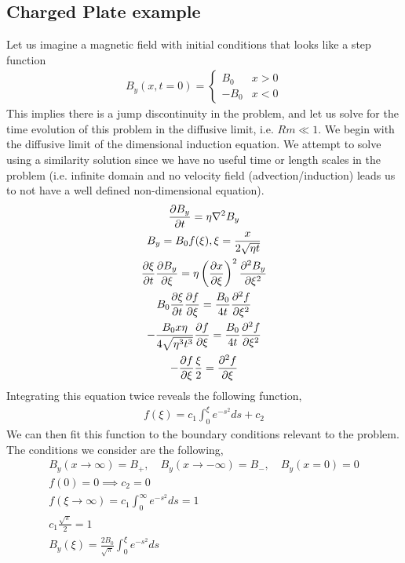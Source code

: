 \documentclass{article}
\begin{document}
\section{}

\subsection{Charged Plate example}

Let us imagine a magnetic field with initial conditions that looks like a step
function 
\begin{gather*}
    B_y(x, t=0) = \begin{cases} B_0 & x >0\\
                                -B_0 & x < 0\end{cases}
\end{gather*}
    This implies there is a jump discontinuity in the problem, and let us solve
    for the time evolution of this problem in the diffusive limit, i.e. $Rm \ll
    1$. We begin with the diffusive limit of the dimensional induction equation.
    We attempt to solve using a similarity solution since we have no useful time
    or length scales in the problem (i.e. infinite domain and no velocity field
    (advection/induction) leads us to not have a well defined non-dimensional
    equation). 
\begin{gather*}
    \frac{\partial B_y}{\partial t} = \eta\nabla^2B_y\\
    B_y = B_0f(\xi), \xi = \frac{x}{2\sqrt{\eta t}}\\
    \frac{\partial \xi}{\partial t}\frac{\partial B_y}{\partial \xi} = \eta\left(\frac{\partial x}{\partial \xi}\right)^2\frac{\partial ^2B_y}{\partial \xi^2}\\
    B_0\frac{\partial \xi}{\partial t}\frac{\partial f}{\partial \xi} = \frac{B_0}{4t}\frac{\partial ^2f}{\partial \xi^2}\\
    -\frac{B_0x\eta}{4\sqrt{\eta^3t^3}}\frac{\partial f}{\partial \xi} =
    \frac{B_0}{4t}\frac{\partial ^2f}{\partial \xi^2}\\
    -\frac{\partial f}{\partial \xi}\frac{\xi}{2} = \frac{\partial ^2f}{\partial \xi}
\end{gather*}
Integrating this equation twice reveals the following function, 
\begin{gather*}
    f(\xi) = c_1\int_0^{\xi} e^{-s^2}ds + c_2
\end{gather*}
We can then fit this function to the boundary conditions relevant to the
problem. The conditions we consider are the following, 
\begin{gather*}
    B_y(x\to\infty) = B_+, \quad B_y(x\to-\infty) = B_-, \quad B_y(x=0) = 0\\
    f(0) = 0 \implies c_2 = 0\\
    f(\xi\to\infty) = c_1\int_0^{\infty} e^{-s^2}ds = 1\\
    c_1\frac{\sqrt{\pi}}{2} = 1\\
    B_y(\xi) = \frac{2B_0}{\sqrt{\pi}}\int_0^{\xi} e^{-s^2}ds
\end{gather*}
\end{document}
